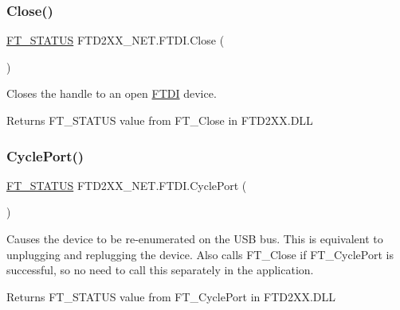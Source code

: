 \subsubsection{\texorpdfstring{Close()}{Close()}}
{\footnotesize\ttfamily \mbox{\hyperlink{class_f_t_d2_x_x___n_e_t_1_1_f_t_d_i_aabe20ad905cc4ccc1e35dd5b877d9a83}{F\+T\+\_\+\+S\+T\+A\+T\+US}} F\+T\+D2\+X\+X\+\_\+\+N\+E\+T.\+F\+T\+D\+I.\+Close (\begin{DoxyParamCaption}{ }\end{DoxyParamCaption})}



Closes the handle to an open \mbox{\hyperlink{class_f_t_d2_x_x___n_e_t_1_1_f_t_d_i}{F\+T\+DI}} device. 

\begin{DoxyReturn}{Returns}
F\+T\+\_\+\+S\+T\+A\+T\+US value from F\+T\+\_\+\+Close in F\+T\+D2\+X\+X.\+D\+LL
\end{DoxyReturn}
\mbox{\label{class_f_t_d2_x_x___n_e_t_1_1_f_t_d_i_a0cb5fd1904ca9d11fb70cbe0645557dd}} 
\subsubsection{\texorpdfstring{CyclePort()}{CyclePort()}}
{\footnotesize\ttfamily \mbox{\hyperlink{class_f_t_d2_x_x___n_e_t_1_1_f_t_d_i_aabe20ad905cc4ccc1e35dd5b877d9a83}{F\+T\+\_\+\+S\+T\+A\+T\+US}} F\+T\+D2\+X\+X\+\_\+\+N\+E\+T.\+F\+T\+D\+I.\+Cycle\+Port (\begin{DoxyParamCaption}{ }\end{DoxyParamCaption})}



Causes the device to be re-\/enumerated on the U\+SB bus. This is equivalent to unplugging and replugging the device. Also calls F\+T\+\_\+\+Close if F\+T\+\_\+\+Cycle\+Port is successful, so no need to call this separately in the application. 

\begin{DoxyReturn}{Returns}
F\+T\+\_\+\+S\+T\+A\+T\+US value from F\+T\+\_\+\+Cycle\+Port in F\+T\+D2\+X\+X.\+D\+LL
\end{DoxyReturn}
\mbox{\label{class_f_t_d2_x_x___n_e_t_1_1_f_t_d_i_ac82039e2c815fa7e9c0084aa4b40246d}} 
